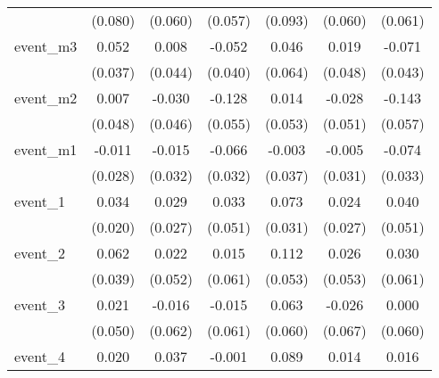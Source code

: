 {\begin{tabular}{l*{6}{c}}
            &     (0.080)         &     (0.060)         &     (0.057)         &     (0.093)         &     (0.060)         &     (0.061)         \\
[1em]
event\_m3    &       0.052         &       0.008         &      -0.052         &       0.046         &       0.019         &      -0.071         \\
            &     (0.037)         &     (0.044)         &     (0.040)         &     (0.064)         &     (0.048)         &     (0.043)         \\
[1em]
event\_m2    &       0.007         &      -0.030         &      -0.128\sym{*}  &       0.014         &      -0.028         &      -0.143\sym{*}  \\
            &     (0.048)         &     (0.046)         &     (0.055)         &     (0.053)         &     (0.051)         &     (0.057)         \\
[1em]
event\_m1    &      -0.011         &      -0.015         &      -0.066\sym{*}  &      -0.003         &      -0.005         &      -0.074\sym{*}  \\
            &     (0.028)         &     (0.032)         &     (0.032)         &     (0.037)         &     (0.031)         &     (0.033)         \\
[1em]
event\_1     &       0.034         &       0.029         &       0.033         &       0.073\sym{*}  &       0.024         &       0.040         \\
            &     (0.020)         &     (0.027)         &     (0.051)         &     (0.031)         &     (0.027)         &     (0.051)         \\
[1em]
event\_2     &       0.062         &       0.022         &       0.015         &       0.112\sym{*}  &       0.026         &       0.030         \\
            &     (0.039)         &     (0.052)         &     (0.061)         &     (0.053)         &     (0.053)         &     (0.061)         \\
[1em]
event\_3     &       0.021         &      -0.016         &      -0.015         &       0.063         &      -0.026         &       0.000         \\
            &     (0.050)         &     (0.062)         &     (0.061)         &     (0.060)         &     (0.067)         &     (0.060)         \\
[1em]
event\_4     &       0.020         &       0.037         &      -0.001         &       0.089         &       0.014         &       0.016         \\

\end{tabular}}
